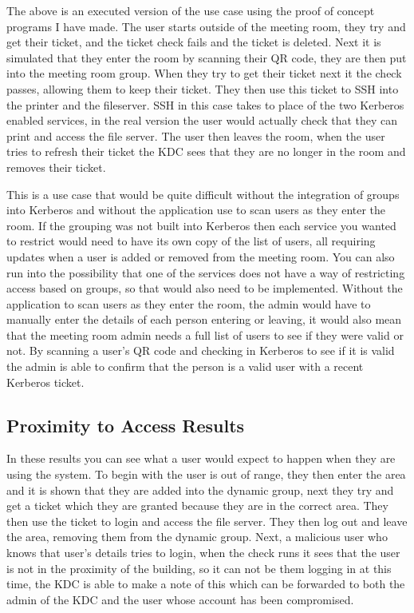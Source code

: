 \documentclass[]{report}   %
\begin{document}
The above is an executed version of the use case using the proof of concept programs I have made. The user starts outside of the meeting room, they try and get their ticket, and the ticket check fails and the ticket is deleted. Next it is simulated that they enter the room by scanning their QR code, they are then put into the meeting room group. When they try to get their ticket next it the check passes, allowing them to keep their ticket. They then use this ticket to SSH into the printer and the fileserver. SSH in this case takes to place of the two Kerberos enabled services, in the real version the user would actually check that they can print and access the file server. The user then leaves the room, when the user tries to refresh their ticket the KDC sees that they are no longer in the room and removes their ticket.

This is a use case that would be quite difficult without the integration of groups into Kerberos and without the application use to scan users as they enter the room. If the grouping was not built into Kerberos then each service you wanted to restrict would need to have its own copy of the list of users, all requiring updates when a user is added or removed from the meeting room. You can also run into the possibility that one of the services does not have a way of restricting access based on groups, so that would also need to be implemented. Without the application to scan users as they enter the room, the admin would have to manually enter the details of each person entering or leaving, it would also mean that the meeting room admin needs a full list of users to see if they were valid or not. By scanning a user's QR code and checking in Kerberos to see if it is valid the admin is able to confirm that the person is a valid user with a recent Kerberos ticket.

\subsection{Proximity to Access Results}
In these results you can see what a user would expect to happen when they are using the system. To begin with the user is out of range, they then enter the area and it is shown that they are added into the dynamic group, next they try and get a ticket which they are granted because they are in the correct area. They then use the ticket to login and access the file server. They then log out and leave the area, removing them from the dynamic group. Next, a malicious user who knows that user's details tries to login, when the check runs it sees that the user is not in the proximity of the building, so it can not be them logging in at this time, the KDC is able to make a note of this which can be forwarded to both the admin of the KDC and the user whose account has been compromised.
\end{document}
